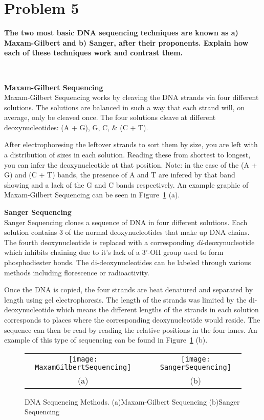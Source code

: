 \newpage
\section{Problem 5}
\textbf{
The two most basic DNA sequencing techniques are known as a) Maxam-Gilbert and b) Sanger, after their proponents. Explain how each of these techniques work and contrast them.
}

\hfill \\

\begin{description}
\item{\textbf{Maxam-Gilbert Sequencing}} \hfill \\
Maxam-Gilbert Sequencing works by cleaving the DNA strands via four different solutions. The solutions are balanced in such a way that each strand will, on average, only be cleaved once. The four solutions cleave at different deoxynucleotides: (A + G), G, C, \& (C + T).

After electrophoresing the leftover strands to sort them by size, you are left with a distribution of sizes in each solution. Reading these from shortest to longest, you can infer the deoxynucleotide at that position. Note: in the case of the (A + G) and (C + T) bands, the presence of A and T are infered by that band showing and a lack of the G and C bands respectively. An example graphic of Maxam-Gilbert Sequencing can be seen in Figure~\ref{sequencing} (a).

\item{\textbf{Sanger Sequencing}} \hfill \\
Sanger Sequencing clones a sequence of DNA in four different solutions. Each solution contains 3 of the normal deoxynucleotides that make up DNA chains. The fourth deoxynucleotide is replaced with a corresponding \textit{di}-deoxynucleotide which inhibits chaining due to it's lack of a 3'-OH group used to form phosphodiester bonds. The di-deoxynucleotides can be labeled through various methods including florescence or radioactivity.

Once the DNA is copied, the four strands are heat denatured and separated by length using gel electrophoresis. The length of the strands was limited by the di-deoxynucleotide which means the different lengths of the strands in each solution corresponds to places where the corresponding deoxynucleotide would reside. The sequence can then be read by reading the relative positions in the four lanes. An example of this type of sequencing can be found in Figure~\ref{sequencing} (b).

\end{description}

\begin{figure} 
\centering
\begin{tabular}{ c c c }
\texttt{[image: MaxamGilbertSequencing]} & \hspace{10pt} &
\texttt{[image: SangerSequencing]} \\
(a) &  & (b)
\end{tabular}
\caption[DNA Sequencing Methods]{DNA Sequencing Methods. (a)Maxam-Gilbert Sequencing (b)Sanger Sequencing}
\label{sequencing}
\end{figure}

